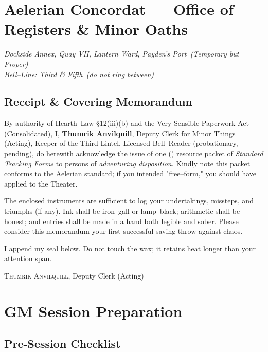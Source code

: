 \documentclass[11pt,letterpaper]{article}
\begin{document}
\maketitle
\thispagestyle{fancy}
\tableofcontents
\newpage

\section*{Aelerian Concordat --- Office of Registers \& Minor Oaths}

\noindent\textit{Dockside Annex, Quay VII, Lantern Ward, Payden's Port \,(Temporary but Proper)}\\
\textit{Bell--Line: Third \& Fifth \,(do not ring between)}

\subsection*{Receipt \& Covering Memorandum}
\noindent By authority of Hearth--Law §12(iii)(b) and the Very Sensible Paperwork Act (Consolidated), I, \textbf{Thumrik Anvilquill}, Deputy Clerk for Minor Things (Acting), Keeper of the Third Lintel, Licensed Bell--Reader (probationary, pending), do herewith acknowledge the issue of one () resource packet of \emph{Standard Tracking Forms} to persons of \emph{adventuring disposition}. Kindly note this packet conforms to the Aelerian standard; if you intended "free--form," you should have applied to the Theater.

\medskip
\noindent The enclosed instruments are sufficient to log your undertakings, missteps, and triumphs (if any). Ink shall be iron--gall or lamp--black; arithmetic shall be honest; and entries shall be made in a hand both legible and sober. Please consider this memorandum your first successful saving throw against chaos.

\medskip
\noindent I append my seal below. Do not touch the wax; it retains heat longer than your attention span.

\hfill\textsc{Thumrik Anvilquill}, Deputy Clerk (Acting)

\section{GM Session Preparation}

\subsection{Pre-Session Checklist}
\end{document}
